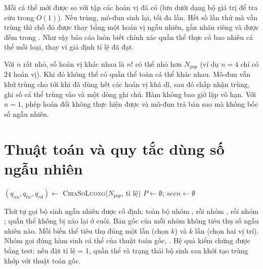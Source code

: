 Mỗi cá thể mới được so với tập các hoán vị đã có (lưu dưới dạng bộ giá trị để tra cứu trong $O(1)$). Nếu
trùng, mô-đun sinh lại, tối đa  lần. Hết số lần thử mà vẫn trùng thì chỗ đó
được thay bằng một hoán vị ngẫu nhiên, gắn nhãn riêng  và được đếm trong
. Như vậy báo cáo luôn biết chính xác quần thể thực có bao nhiêu cá thể mỗi loại,
thay vì giả định tỉ lệ đã đạt.

Với $n$ rất nhỏ, số hoán vị khác nhau là $n!$ có thể nhỏ hơn $N_{pop}$ (ví dụ $n = 4$ chỉ có 24 hoán
vị). Khi đó không thể có quần thể toàn cá thể khác nhau. Mô-đun vẫn khử trùng cho tới khi đã dùng hết
các hoán vị khả dĩ, sau đó chấp nhận trùng, ghi số cá thể trùng vào  và một dòng
ghi chú. Hàm không bao giờ lặp vô hạn. Với $n = 1$, phép hoán đổi không thực hiện được và mô-đun trả bản
sao mà không bốc số ngẫu nhiên.

\section{Thuật toán và quy tắc dùng số ngẫu nhiên}

\begin{algorithm}[H]
\caption{Khởi tạo quần thể thông minh}
\label{alg:init}
$(q_{nn}, q_{tw}, q_{rd}) \gets$ \textsc{ChiaSoLuong}($N_{pop}$, tỉ lệ)\;
$P \gets \emptyset$; $\textit{seen} \gets \emptyset$\;
\end{algorithm}

Thứ tự gọi bộ sinh ngẫu nhiên được cố định: toàn bộ nhóm , rồi nhóm , rồi nhóm
; quần thể không bị xáo lại ở cuối. Bản gốc của mỗi nhóm không tiêu thụ số ngẫu nhiên nào.
Mỗi biến thể tiêu thụ đúng một lần  (chọn $k$) và $k$ lần  (chọn hai
vị trí). Nhóm  gọi đúng hàm sinh cá thể của thuật toán gốc,
. Hệ quả kiểm chứng được bằng test: nếu đặt tỉ lệ
 = 1, quần thể và trạng thái bộ sinh sau khởi tạo trùng khớp với thuật toán gốc.

